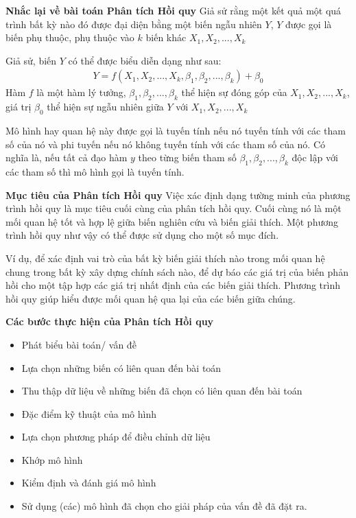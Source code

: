 \documentclass{article}
\begin{document}
	\textbf{Nhắc lại về bài toán Phân tích Hồi quy}
	Giả sử rằng một kết quả một quá trình bất kỳ nào đó được đại diện bằng một biến ngẫu nhiên $Y$, $Y$ được gọi là biến phụ thuộc, phụ thuộc vào $k$ biến khác $X_1, X_2, ..., X_k$

	Giả sử, biến $Y$ có thể được biểu diễn dạng như sau:
	\begin{align*}
		Y = f(X_1, X_2, ..., X_k, \beta_1, \beta_2, ..., \beta_k) + \beta_0
	\end{align*}
	Hàm $f$ là một hàm lý tưởng, $\beta_1, \beta_2, ..., \beta_k$ thể hiện sự đóng góp của $X_1, X_2, ..., X_k$, giá trị $\beta_0$ thể hiện sự ngẫu nhiên giữa $Y$ với $X_1, X_2, ..., X_k$
	
	Mô hình hay quan hệ này được gọi là tuyến tính nếu nó tuyến tính với các tham số của nó và phi tuyến nếu nó không tuyến tính với các tham số của nó. Có nghĩa là, nếu tất cả đạo hàm $y$ theo từng biến tham số $\beta_1, \beta_2, ..., \beta_k$ độc lập với các tham số thì mô hình gọi là tuyến tính.
	
	\textbf{Mục tiêu của Phân tích Hồi quy} Việc xác định dạng tường minh của phương trình hồi quy là mục tiêu cuối cùng của phân tích hồi quy. Cuối cùng nó là một mối quan hệ tốt và hợp lệ giữa biến nghiên cứu và biến giải thích. Một phương trình hồi quy như vậy có thể được sử dụng cho một số mục đích. 
	
	Ví dụ, để xác định vai trò của bất kỳ biến giải thích nào trong mối quan hệ chung trong bất kỳ xây dựng chính sách nào, để dự báo các giá trị của biến phản hồi cho một tập hợp các giá trị nhất định của các biến giải thích. Phương trình hồi quy giúp hiểu được mối quan hệ qua lại của các biến giữa chúng.
	
	\textbf{Các bước thực hiện của Phân tích Hồi quy}
	\begin{itemize}
		\item Phát biểu bài toán/ vấn đề
		\item Lựa chọn những biến có liên quan đến bài toán
		\item Thu thập dữ liệu về những biến đã chọn có liên quan đến bài toán
		\item Đặc điểm kỹ thuật của mô hình
		\item Lựa chọn phương pháp để điều chỉnh dữ liệu
		\item Khớp mô hình
		\item Kiểm định và đánh giá mô hình
		\item Sử dụng (các) mô hình đã chọn cho giải pháp của vấn đề đã đặt ra.
	\end{itemize}
\end{document}

